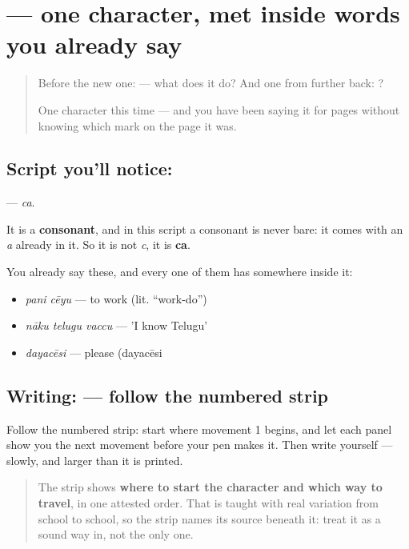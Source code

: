 \section[\texorpdfstring{\te{చ} (ca)}{చ (ca)}]{ — one character, met inside words you already say}

\label{lesson:TE-S112-letter-ca}



\begin{quote}
Before the new one:  — what does it do? And one from further back: ?

One character this time — and you have been saying it for pages without knowing which mark on the page it was.
\end{quote}

\subsection*{Script you'll notice: }
\textbf{} — \emph{ca}.

It is a \textbf{consonant}, and in this script a consonant is never bare: it comes with an \emph{a} already in it. So it is not \emph{c}, it is \textbf{ca}.

You already say these, and every one of them has  somewhere inside it:

\begin{itemize}
\raggedright
  \item \textbf{ } \emph{pani cēyu} — to work (lit. \textquotedblleft{}work-do\textquotedblright{})
  \item \textbf{  } \emph{nāku telugu vaccu} — 'I know Telugu'
  \item \textbf{} \emph{dayacēsi} — please (dayacēsi
\end{itemize}

\subsection*{Writing:  — follow the numbered strip}

Follow the numbered strip: start where movement 1 begins, and let each panel show you the next movement before your pen makes it. Then write  yourself — slowly, and larger than it is printed.

\begin{quote}
The strip shows \textbf{where to start the character and which way to travel}, in one attested order. That is taught with real variation from school to school, so the strip names its source beneath it: treat it as a sound way in, not the only one.
\end{quote}

